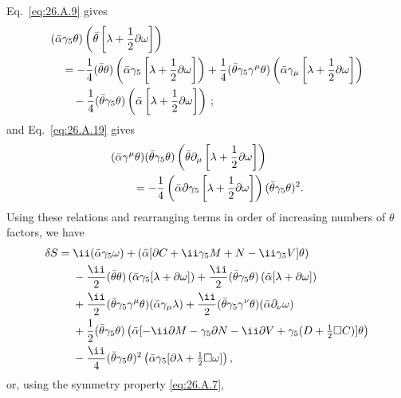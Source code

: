 Eq.~\eqref{eq:26.A.9} gives
\[
  \begin{aligned}
  &(\bar\alpha\gamma_5\theta)
    \left(\bar\theta\left[\lambda+\frac12\sl{\partial}\omega\right]\right)\\
  &\quad=-\frac14(\bar\theta\theta)
    \left(\bar\alpha\gamma_5
      \left[\lambda+\frac12\sl{\partial}\omega\right]\right)
  +\frac14(\bar\theta\gamma_5\gamma^\mu\theta)
    \left(\bar\alpha\gamma_\mu
      \left[\lambda+\frac12\sl{\partial}\omega\right]\right)\\
  &\qquad-\frac14(\bar\theta\gamma_5\theta)
    \left(\bar\alpha
      \left[\lambda+\frac12\sl{\partial}\omega\right]\right)\,;
  \end{aligned}
\]
and Eq.~\eqref{eq:26.A.19} gives
\[
  \begin{aligned}
  &(\bar\alpha\gamma^\mu\theta)(\bar\theta\gamma_5\theta)
    \left(\bar\theta\partial_\mu
      \left[\lambda+\frac12\sl{\partial}\omega\right]\right)\\
  &\qquad=-\frac14
    \left(\bar\alpha\sl{\partial}\gamma_5
      \left[\lambda+\frac12\sl{\partial}\omega\right]\right)
    (\bar\theta\gamma_5\theta)^2.
  \end{aligned}
\]
Using these relations and rearranging terms in order of increasing numbers of
$\theta$ factors, we have
\[
  \begin{aligned}
  \delta S={}&\ii(\bar\alpha\gamma_5\omega)
  +\left(\bar\alpha
    [\sl{\partial}C+\ii\gamma_5M+N-\ii\gamma_5\sl{V}]\theta\right)\\
  &-\frac{\ii}{2}(\bar\theta\theta)
    \left(\bar\alpha\gamma_5[\lambda+\sl{\partial}\omega]\right)
  +\frac{\ii}{2}(\bar\theta\gamma_5\theta)
    \left(\bar\alpha[\lambda+\sl{\partial}\omega]\right)\\
  &+\frac{\ii}{2}(\bar\theta\gamma_5\gamma^\mu\theta)
    (\bar\alpha\gamma_\mu\lambda)
  +\frac{\ii}{2}(\bar\theta\gamma_5\gamma^\nu\theta)
    (\bar\alpha\partial_\nu\omega)\\
  &+\frac12(\bar\theta\gamma_5\theta)
    \left(\bar\alpha
      [-\ii\sl{\partial}M-\gamma_5\sl{\partial}N
       -\ii\sl{\partial}\sl{V}
       +\gamma_5(D+\tfrac12\Box C)]\theta\right)\\
  &-\frac{\ii}{4}(\bar\theta\gamma_5\theta)^2
    \left(\bar\alpha\gamma_5
      [\sl{\partial}\lambda+\tfrac12\Box\omega]\right),
  \end{aligned}
\]
or, using the symmetry property \eqref{eq:26.A.7},
